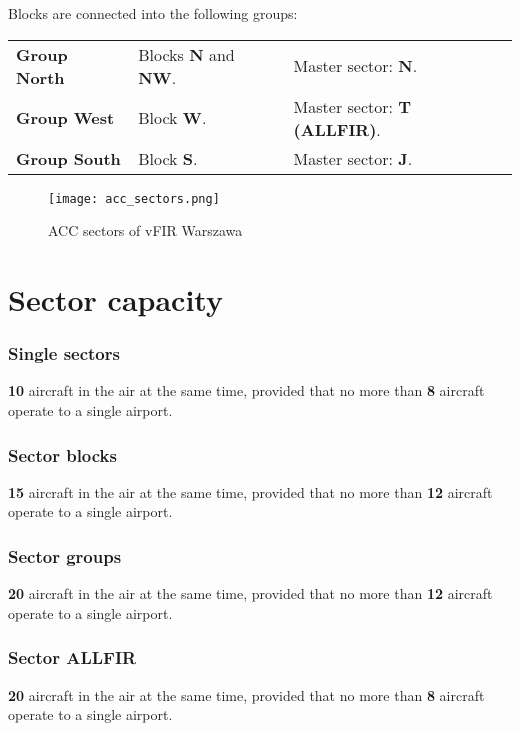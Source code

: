 Blocks are connected into the following groups:

\begin{tabular}{lll}
  \textbf{Group North}&Blocks \textbf{N} and \textbf{NW}.& Master sector: \textbf{N}.\\
  \textbf{Group West}&Block \textbf{W}.&Master sector: \textbf{T (ALLFIR)}.\\
  \textbf{Group South}&Block \textbf{S}.&Master sector: \textbf{J}.\\
\end{tabular}

\begin{figure}[htbp]
  \centering
  \texttt{[image: acc\_sectors.png]}
  \caption{ACC sectors of vFIR Warszawa}
  \label{fig:acc:sectors}
\end{figure}

\section{Sector capacity}
\label{sec:acc:sectorcapacity}

\subsubsection{Single sectors}

\textbf{10} aircraft in the air at the same time, provided that no more than
\textbf{8} aircraft operate to a single airport.

\subsubsection{Sector blocks}

\textbf{15} aircraft in the air at the same time, provided that no more than
\textbf{12} aircraft operate to a single airport.

\subsubsection{Sector groups}

\textbf{20} aircraft in the air at the same time, provided that no more than
\textbf{12} aircraft operate to a single airport.

\subsubsection{Sector ALLFIR}

\textbf{20} aircraft in the air at the same time, provided that no more than
\textbf{8} aircraft operate to a single airport.

